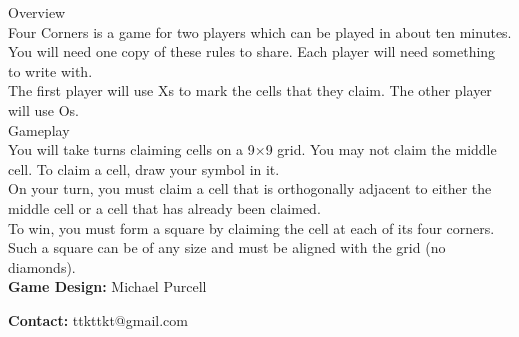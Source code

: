 \begin{minipage}{6cm}\raggedright
{\setmainfont[Scale=0.95]{Century Gothic-Bold}\LARGE Overview}\\[1.0ex]

\setmainfont{Tex Gyre Schola}
Four Corners is a game for two players which can be played in about ten minutes.\\[1.25ex]

You will need one copy of these rules to share. Each player will need something to write with.\\[1.25ex]

The first player will use {\setmainfont[Scale=0.95]{Century Gothic-Bold} X}s to mark the cells that they claim. The other player will use {\setmainfont[Scale=0.95]{Century Gothic-Bold} O}s.\\[3ex]

{\setmainfont[Scale=0.95]{Century Gothic-Bold}\LARGE Gameplay}\\[1.0ex]

You will take turns claiming cells on a 9$\times$9 grid. You may not claim the middle cell. To claim a cell, draw your symbol in it. \\[1.25ex]


On your turn, you must claim a cell that is orthogonally adjacent to either the middle cell or a cell that has already been claimed.\\[1.25ex]

To win, you must form a square by claiming the cell at each of its four corners. Such a square can be of any size and must be aligned with the grid (no diamonds).\\[1.25ex]

\textbf{Game Design:} Michael Purcell

\textbf{Contact:} ttkttkt@gmail.com
\end{minipage}